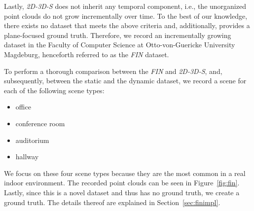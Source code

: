 \documentclass[main.tex]{subfiles}
\begin{document}
Lastly, \textit{2D-3D-S} does not inherit any temporal component, i.e., the unorganized point clouds do not grow incrementally over time.
To the best of our knowledge, there exists no dataset that meets the above criteria and, additionally, provides a plane-focused ground truth.
Therefore, we record an incrementally growing dataset in the Faculty of Computer Science at Otto-von-Guericke University Magdeburg, 
henceforth referred to as the \textit{FIN} dataset.
 


To perform a thorough comparison between the \textit{FIN} and \textit{2D-3D-S}, and, subsequently, between the static and the dynamic dataset, we record a scene for each of the following scene types:
\begin{itemize}
    \item office
    \item conference room
    \item auditorium
    \item hallway
\end{itemize}

We focus on these four scene types because they are the most common in a real indoor environment.
The recorded point clouds can be seen in Figure~\ref{fig:fin}.
Lastly, since this is a novel dataset and thus has no ground truth, we create a ground truth. The details thereof are explained in Section~\ref{sec:finimpl}.
\end{document}
